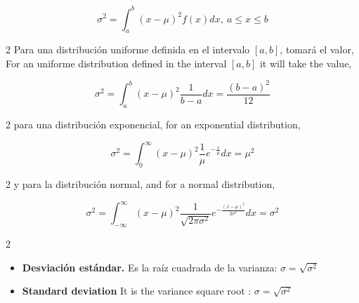 \begin{equation*}
\sigma^2 = \int_a^b (x-\mu)^2f(x)dx, \ a\leqslant x \leqslant b
\end{equation*}
\begin{paracol}{2}
Para una distribución uniforme definida en el intervalo $[a,b]$, tomará el valor,
\switchcolumn
For an uniforme distribution defined in the interval $[a,b]$ it will take the value,
\end{paracol}
\begin{equation*}
\sigma^2 = \int_a^b (x-\mu)^2\frac{1}{b-a}dx = \frac{(b-a)^2}{12}
\end{equation*}
\begin{paracol}{2}
para una distribución exponencial,
\switchcolumn
for an exponential distribution,
\end{paracol}
\begin{equation*}
\sigma^2 = \int_0^{\infty}(x-\mu)^2\frac{1}{\mu}e^{-\frac{x}{\mu}}dx = \mu^2
\end{equation*}
\begin{paracol}{2}
y para la distribución normal,
\switchcolumn
and for a normal distribution,
\end{paracol}
\begin{equation*}
\sigma^2 = \int_{-\infty}^{\infty}(x-\mu)^2 \frac{1}{\sqrt{2\pi\sigma^2}}e^{-\frac{(x-\mu)^2}{2\sigma^2}}dx= \sigma^2
\end{equation*}
\begin{paracol}{2}
\begin{itemize}
\item \textbf{Desviación estándar.}  Es la raíz cuadrada de la varianza: $\sigma =\sqrt{\sigma^2}$  
\end{itemize}
\switchcolumn
\begin{itemize}
\item \textbf{Standard deviation}  It is the variance square root : $\sigma =\sqrt{\sigma^2}$
\end{itemize}  
\end{paracol}

